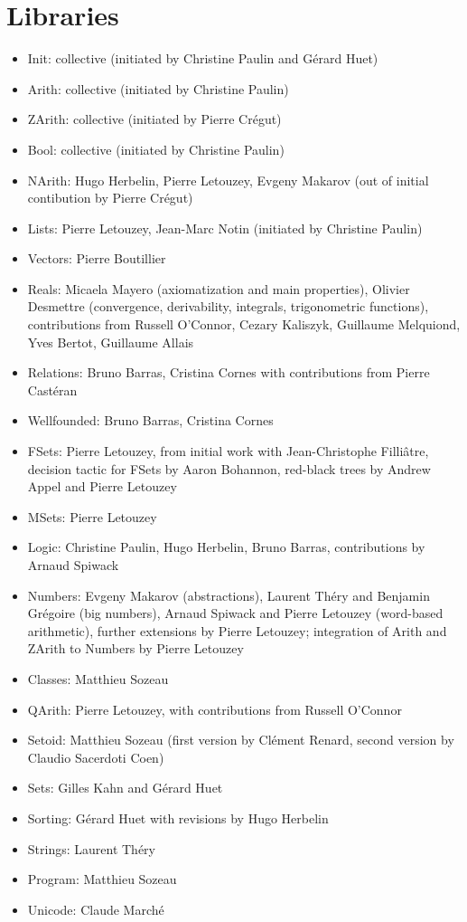 \documentclass{article}
\begin{document}
\section{Libraries}

\begin{itemize}
\item Init: collective (initiated by Christine Paulin and Gérard Huet)
\item Arith: collective (initiated by Christine Paulin)
\item ZArith: collective (initiated by Pierre Crégut)
\item Bool: collective (initiated by Christine Paulin)
\item NArith: Hugo Herbelin, Pierre Letouzey, Evgeny Makarov (out of
  initial contibution by Pierre Crégut)
\item Lists: Pierre Letouzey, Jean-Marc Notin (initiated by Christine Paulin)
\item Vectors: Pierre Boutillier
\item Reals: Micaela Mayero (axiomatization and main properties), Olivier Desmettre (convergence, derivability, integrals, trigonometric functions), contributions from Russell O'Connor, Cezary Kaliszyk, Guillaume Melquiond, Yves Bertot, Guillaume Allais
\item Relations: Bruno Barras, Cristina Cornes with contributions from
  Pierre Castéran
\item Wellfounded: Bruno Barras, Cristina Cornes
\item FSets: Pierre Letouzey, from initial work with Jean-Christophe Filliâtre, decision tactic for FSets by Aaron Bohannon, red-black trees by Andrew Appel and Pierre Letouzey
\item MSets: Pierre Letouzey
\item Logic: Christine Paulin, Hugo Herbelin, Bruno Barras, contributions by Arnaud Spiwack
\item Numbers: Evgeny Makarov (abstractions), Laurent Théry and Benjamin Grégoire (big numbers), Arnaud Spiwack and Pierre Letouzey (word-based arithmetic), further extensions by Pierre Letouzey; integration of Arith and ZArith to Numbers by Pierre Letouzey
\item Classes: Matthieu Sozeau
\item QArith: Pierre Letouzey, with contributions from Russell O'Connor
\item Setoid: Matthieu Sozeau (first version by Clément Renard, second version by Claudio Sacerdoti Coen)
\item Sets: Gilles Kahn and Gérard Huet
\item Sorting: Gérard Huet with revisions by Hugo Herbelin
\item Strings: Laurent Théry
\item Program: Matthieu Sozeau
\item Unicode: Claude Marché
\end{itemize}
\end{document}

